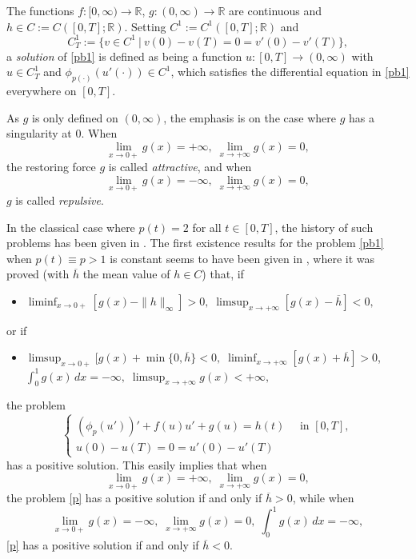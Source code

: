\documentclass[11pt]{amsart}
\numberwithin{equation}{section} \textwidth=15.5cm
\begin{document}
The functions $f:[0,\infty)\to\mathbb{R}$, $g:(0,\infty)\to\mathbb{R}$ are continuous and $h\in C:=C([0,T]; \mathbb{R})$. Setting $C^1:= C^1 ([0,T]; \mathbb{R})$ and
$$C_T^1:=\{v\in C^1\ |\ v(0)-v(T)=0=v'(0)-v'(T)\},$$
a {\sl solution} of \eqref{pb1} is defined as being a function $u:[0,T]\to(0,\infty)$ with $u\in C_T^1$ and  $\phi_{p(\cdot )}(u'( \cdot ))\in C^1$, which satisfies the differential equation in \eqref{pb1} everywhere on $[0,T]$.
\medskip

As $g$ is only defined on $(0,\infty)$, the emphasis is on the case where $g$ has a singularity at $0$. When
$$\lim_{x \to 0+} g(x) = + \infty, \; \lim_{x \to + \infty} g(x) = 0,$$
the restoring force $g$ is called {\it attractive}, and when
$$\lim_{x \to 0+} g(x) = - \infty, \; \lim_{x \to + \infty} g(x) = 0,$$
 $g$ is called {\it repulsive}.
\medskip

In the classical case where $p(t) = 2$ for all $t \in [0,T]$, the history of such problems has been given in \cite{[Maw93],[JMANS]}.
The first existence results for the problem \eqref{pb1} when $p(t)\equiv p > 1$ is constant seems to have been given in \cite{[JMANS]}, where it was proved  (with $\overline h$ the mean value of $h \in C$) that, if
 \begin{itemize}
 \item[$(A)$] $\displaystyle \liminf_{x \to 0+}[g(x) - \|h\|_\infty] > 0,\; \limsup_{x \to + \infty}[g(x) - \overline h] < 0,$
 \end{itemize}
or if
 \begin{itemize}
\item[$(R)$] $\displaystyle \limsup_{x \to 0+}[g(x) + \min\{0,\overline h\} < 0, \; \liminf_{x \to +\infty} [g(x) + \overline h] >0$,\\
$\displaystyle \int_0^1 g(x)\,dx = - \infty, \; \limsup_{x \to + \infty} g(x) < +\infty,$
\end{itemize}
the problem
\begin{equation}\label{p}
	\left \{
            \begin{array}{ll}
		      (\phi_{p}(u'))'+f(u)u'+g(u)=h(t)\quad \mbox{ in }[0,T],\\
		      u(0)-u(T)=0=u'(0)-u'(T)
			\end{array}
\right.
\end{equation}
has a positive solution. This easily implies that when
$$\lim_{x \to 0+}g(x) = + \infty, \; \lim_{x \to +\infty} g(x) = 0,$$
the problem \eqref{p} has a positive solution if and only if $\overline h > 0$, while when
 $$\lim_{x \to 0+}g(x) = - \infty, \; \lim_{x \to + \infty} g(x) = 0,\; \int_0^1 g(x)\,dx = - \infty,$$
\eqref{p} has a positive solution if and only if $\overline h < 0$.
\medskip
\end{document}
